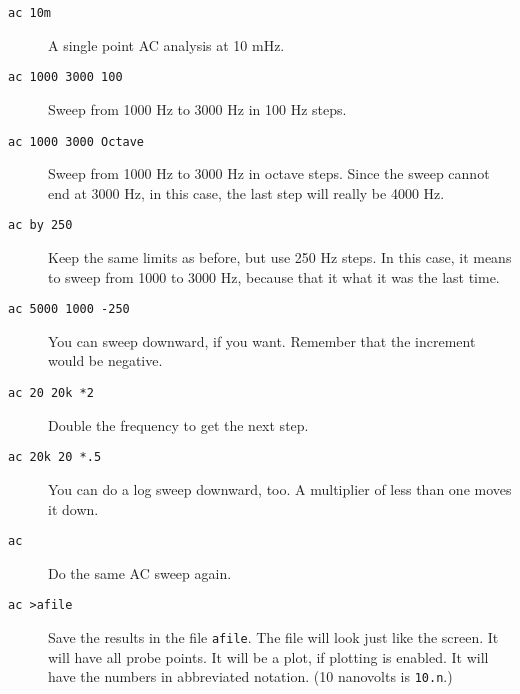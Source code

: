 \begin{description}

\item[{\tt ac 10m}] A single point AC analysis at 10 mHz.

\item[{\tt ac 1000 3000 100}] Sweep from 1000 Hz to 3000 Hz in 100 Hz steps.

\item[{\tt ac 1000 3000 Octave}] Sweep from 1000 Hz to 3000 Hz in octave
steps.  Since the sweep cannot end at 3000 Hz, in this case, the last step
will really be 4000 Hz.

\item[{\tt ac by 250}] Keep the same limits as before, but use 250 Hz
steps.  In this case, it means to sweep from 1000 to 3000 Hz, because that
it what it was the last time.

\item[{\tt ac 5000 1000 -250}] You can sweep downward, if you want.
Remember that the increment would be negative.

\item[{\tt ac 20 20k *2}] Double the frequency to get the next step.

\item[{\tt ac 20k 20 *.5}] You can do a log sweep downward, too.  A
multiplier of less than one moves it down.

\item[{\tt ac}] Do the same AC sweep again.

\item[{\tt ac >afile}] Save the results in the file {\tt afile}.  The
file will look just like the screen.  It will have all probe points.  It
will be a plot, if plotting is enabled.  It will have the numbers in
abbreviated notation.  (10 nanovolts is {\tt 10.n}.)

\end{description}
